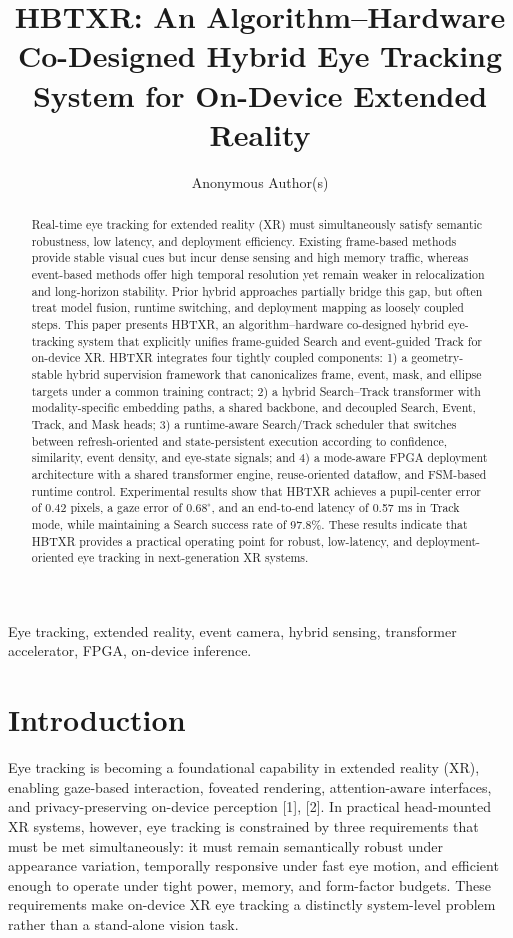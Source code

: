 \documentclass[journal]{IEEEtran}
\title{HBTXR: An Algorithm--Hardware Co-Designed Hybrid Eye Tracking System for On-Device Extended Reality}
\author{Anonymous Author(s)}
\begin{document}
\maketitle

\begin{abstract}
Real-time eye tracking for extended reality (XR) must simultaneously satisfy semantic robustness, low latency, and deployment efficiency. Existing frame-based methods provide stable visual cues but incur dense sensing and high memory traffic, whereas event-based methods offer high temporal resolution yet remain weaker in relocalization and long-horizon stability. Prior hybrid approaches partially bridge this gap, but often treat model fusion, runtime switching, and deployment mapping as loosely coupled steps. This paper presents HBTXR, an algorithm--hardware co-designed hybrid eye-tracking system that explicitly unifies frame-guided Search and event-guided Track for on-device XR. HBTXR integrates four tightly coupled components: 1) a geometry-stable hybrid supervision framework that canonicalizes frame, event, mask, and ellipse targets under a common training contract; 2) a hybrid Search--Track transformer with modality-specific embedding paths, a shared backbone, and decoupled Search, Event, Track, and Mask heads; 3) a runtime-aware Search/Track scheduler that switches between refresh-oriented and state-persistent execution according to confidence, similarity, event density, and eye-state signals; and 4) a mode-aware FPGA deployment architecture with a shared transformer engine, reuse-oriented dataflow, and FSM-based runtime control. Experimental results show that HBTXR achieves a pupil-center error of 0.42 pixels, a gaze error of $0.68^{\circ}$, and an end-to-end latency of 0.57 ms in Track mode, while maintaining a Search success rate of 97.8\%. These results indicate that HBTXR provides a practical operating point for robust, low-latency, and deployment-oriented eye tracking in next-generation XR systems.
\end{abstract}

\begin{IEEEkeywords}
Eye tracking, extended reality, event camera, hybrid sensing, transformer accelerator, FPGA, on-device inference.
\end{IEEEkeywords}

\section{Introduction}
Eye tracking is becoming a foundational capability in extended reality (XR), enabling gaze-based interaction, foveated rendering, attention-aware interfaces, and privacy-preserving on-device perception [1], [2]. In practical head-mounted XR systems, however, eye tracking is constrained by three requirements that must be met simultaneously: it must remain semantically robust under appearance variation, temporally responsive under fast eye motion, and efficient enough to operate under tight power, memory, and form-factor budgets. These requirements make on-device XR eye tracking a distinctly system-level problem rather than a stand-alone vision task.
\end{document}
